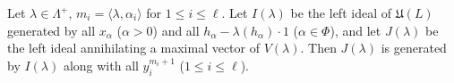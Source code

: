Let $\lambda \in \Lambda^+$, $m_i = \langle \lambda, \alpha_i \rangle$ for $1 \leq i \leq \ell$. Let $I(\lambda)$ be the left ideal of $\mathfrak{U}(L)$ generated by all $x_\alpha$ ($\alpha > 0$) and all $h_\alpha - \lambda(h_\alpha) \cdot 1$ ($\alpha \in \Phi$), and let $J(\lambda)$ be the left ideal annihilating a maximal vector of $V(\lambda)$. Then $J(\lambda)$ is generated by $I(\lambda)$ along with all $y_i^{m_i+1}$ ($1 \leq i \leq \ell$).
